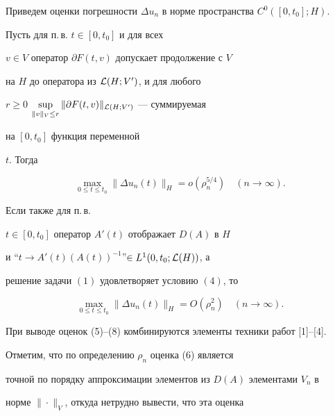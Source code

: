 Приведем оценки погрешности $\Delta u_{n}$ в норме пространства $C^{0}([0,


t_{0}];H)$.





\begin{thm} Пусть для п.\,в. $t\in [0,t_{0}]$ и для всех


$v\in V$ оператор $\partial F(t,v)$ допускает продолжение с $V$


на $H$ до оператора из ${\cal L}(H;V')$, и для любого


$r\ge 0$\; $\sup\limits_{\|v\|_{V} \leq r}\|\partial


F(t,v)\|_{{\cal L}(H;V')}$ --- суммируемая


на $[0,t_{0}]$ функция переменной


$t$. Тогда


\begin{equation}


\max_{0\leq t\leq t_{0}}\|\Delta u_{n}(t) \|_{H} =


o(\rho^{5/4}_{n})\quad (n\to\infty).


\end{equation}


Если также для п.\,в.


$t\in [0,t_{0}]$ оператор $A'(t)$ отображает $D(A)$ в $H$


и ``$t\to A'(t) (A(t))^{-1}$''$\in L^{1}(0,t_{0}; {\cal L}(H))$, а


решение задачи $(1)$ удовлетворяет условию $(4)$, то


\begin{equation}


\max_{0\leq t\leq t_{0}}\|\Delta u_{n}(t) \|_{H} =


O(\rho^{2}_{n})\quad (n\to\infty).


\end{equation}


\end{thm}





При выводе оценок (5)--(8) комбинируются элементы техники работ [1]--[4].


Отметим, что по определению  $\rho_{n}$ оценка (6) является


точной по порядку аппроксимации элементов из $D(A)$ элементами $V_{n}$ в


норме $\|\cdot\|_{V}$, откуда нетрудно вывести, что эта оценка


